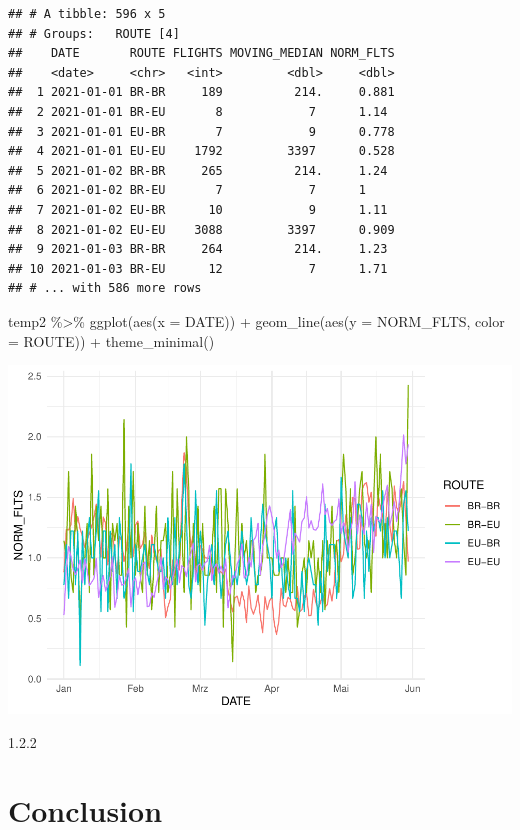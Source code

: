\documentclass[conference,final,]{IEEEtran}
\makeatletter
\def\maxwidth{\ifdim\Gin@nat@width>\linewidth\linewidth
\else\Gin@nat@width\fi}
\let\Oldincludegraphics\includegraphics
\renewcommand{\includegraphics}[1]{\Oldincludegraphics[width=\maxwidth]{#1}}
\newenvironment{Shaded}{\begin{snugshade}}{\end{snugshade}}
\newcommand{\AttributeTok}[1]{\textcolor[rgb]{0.77,0.63,0.00}{#1}}
\newcommand{\FunctionTok}[1]{\textcolor[rgb]{0.00,0.00,0.00}{#1}}
\newcommand{\NormalTok}[1]{#1}
\newcommand{\SpecialCharTok}[1]{\textcolor[rgb]{0.00,0.00,0.00}{#1}}
\makeatother
\begin{document}
\begin{verbatim}
## # A tibble: 596 x 5
## # Groups:   ROUTE [4]
##    DATE       ROUTE FLIGHTS MOVING_MEDIAN NORM_FLTS
##    <date>     <chr>   <int>         <dbl>     <dbl>
##  1 2021-01-01 BR-BR     189          214.     0.881
##  2 2021-01-01 BR-EU       8            7      1.14 
##  3 2021-01-01 EU-BR       7            9      0.778
##  4 2021-01-01 EU-EU    1792         3397      0.528
##  5 2021-01-02 BR-BR     265          214.     1.24 
##  6 2021-01-02 BR-EU       7            7      1    
##  7 2021-01-02 EU-BR      10            9      1.11 
##  8 2021-01-02 EU-EU    3088         3397      0.909
##  9 2021-01-03 BR-BR     264          214.     1.23 
## 10 2021-01-03 BR-EU      12            7      1.71 
## # ... with 586 more rows
\end{verbatim}

\begin{Shaded}
\begin{Highlighting}[]
\NormalTok{temp2 }\SpecialCharTok{\%\textgreater{}\%} \FunctionTok{ggplot}\NormalTok{(}\FunctionTok{aes}\NormalTok{(}\AttributeTok{x =}\NormalTok{ DATE)) }\SpecialCharTok{+}
  \FunctionTok{geom\_line}\NormalTok{(}\FunctionTok{aes}\NormalTok{(}\AttributeTok{y =}\NormalTok{ NORM\_FLTS, }\AttributeTok{color =}\NormalTok{ ROUTE)) }\SpecialCharTok{+}
  \FunctionTok{theme\_minimal}\NormalTok{()}
\end{Highlighting}
\end{Shaded}

\includegraphics{paper_files/figure-latex/unnamed-chunk-6-2.pdf}

1.2.2

\hypertarget{conclusion}{%
\section{Conclusion}\label{conclusion}}
\end{document}
